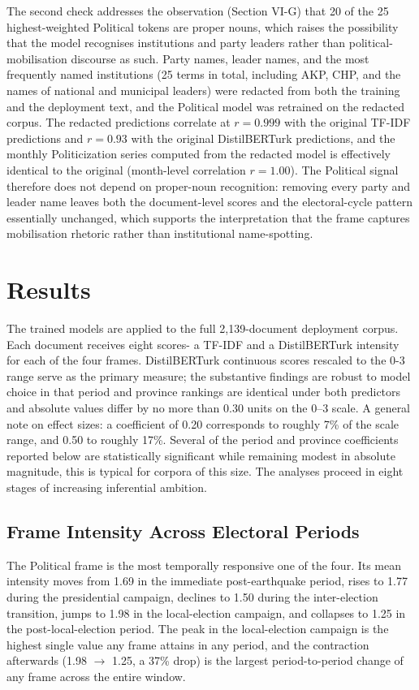 \documentclass[12pt, journal]{IEEEtran}
\begin{document}
The second check addresses the observation (Section VI-G) that 20 of the 25 highest-weighted Political tokens are proper nouns, which raises the possibility that the model recognises institutions and party leaders rather than political-mobilisation discourse as such. Party names, leader names, and the most frequently named institutions (25 terms in total, including AKP, CHP, and the names of national and municipal leaders) were redacted from both the training and the deployment text, and the Political model was retrained on the redacted corpus. The redacted predictions correlate at $r = 0.999$ with the original TF-IDF predictions and $r = 0.93$ with the original DistilBERTurk predictions, and the monthly Politicization series computed from the redacted model is effectively identical to the original (month-level correlation $r = 1.00$). The Political signal therefore does not depend on proper-noun recognition: removing every party and leader name leaves both the document-level scores and the electoral-cycle pattern essentially unchanged, which supports the interpretation that the frame captures mobilisation rhetoric rather than institutional name-spotting.

\section{Results}
The trained models are applied to the full 2,139-document deployment corpus. Each document receives eight scores- a TF-IDF and a DistilBERTurk intensity for each of the four frames. DistilBERTurk continuous scores rescaled to the 0-3 range serve as the primary measure; the substantive findings are robust to model choice in that period and province rankings are identical under both predictors and absolute values differ by no more than 0.30 units on the 0--3 scale. A general note on effect sizes: a coefficient of 0.20 corresponds to roughly 7\% of the scale range, and 0.50 to roughly 17\%. Several of the period and province coefficients reported below are statistically significant while remaining modest in absolute magnitude, this is typical for corpora of this size. The analyses proceed in eight stages of increasing inferential ambition.

\subsection{Frame Intensity Across Electoral Periods}
The Political frame is the most temporally responsive one of the four. Its mean intensity moves from 1.69 in the immediate post-earthquake period, rises to 1.77 during the presidential campaign, declines to 1.50 during the inter-election transition, jumps to 1.98 in the local-election campaign, and collapses to 1.25 in the post-local-election period. The peak in the local-election campaign is the highest single value any frame attains in any period, and the contraction afterwards (1.98 $\rightarrow$ 1.25, a 37\% drop) is the largest period-to-period change of any frame across the entire window.
\end{document}
